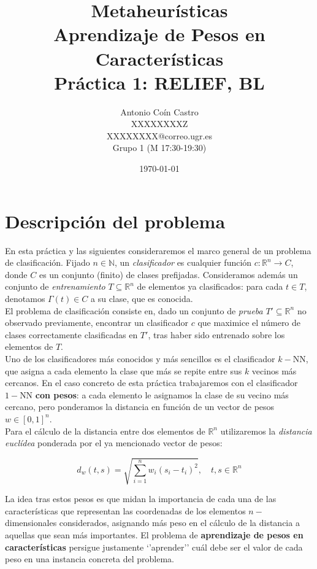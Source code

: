 \documentclass[12pt]{article}
\title{Metaheurísticas\\ \Large Aprendizaje de Pesos en Características \\ \large Práctica 1: RELIEF, BL}
\author{Antonio Coín Castro \\ XXXXXXXXZ \\ XXXXXXXX@correo.ugr.es \\ Grupo 1 (M 17:30-19:30)}
\date{\today}
\begin{document}
\maketitle

\newpage
\section{Descripción del problema}

En esta práctica y las siguientes consideraremos el marco general de un problema de clasificación. Fijado $n \in \mathbb{N}$, un \textit{clasificador} es cualquier función $c: \mathbb{R}^n \to C$, donde $C$ es un conjunto (finito) de clases prefijadas. Consideramos además un conjunto de \textit{entrenamiento} $T \subseteq \mathbb{R}^n$ de elementos ya clasificados: para cada $t \in T$, denotamos $\Gamma(t) \in C$ a su clase, que es conocida.\\

El problema de clasificación consiste en, dado un conjunto de \textit{prueba} $T'\subseteq \mathbb{R}^n$ no observado previamente, encontrar un clasificador $c$ que maximice el número de clases correctamente clasificadas en $T'$, tras haber sido entrenado sobre los elementos de $T$.\\

Uno de los clasificadores más conocidos y más sencillos es el clasificador $k-$NN, que asigna a cada elemento la clase que más se repite entre sus $k$ vecinos más cercanos. En el caso concreto de esta práctica trabajaremos con el clasificador $1-$NN \textbf{con pesos}: a cada elemento le asignamos la clase de su vecino más cercano, pero ponderamos la distancia en función de un vector de pesos $w \in [0,1]^n$.\\

Para el cálculo de la distancia entre dos elementos de $\mathbb{R}^n$ utilizaremos la \textit{distancia euclídea} ponderada por el ya mencionado vector de pesos:

\[
    d_w(t, s) = \sqrt{\sum_{i=1}^n w_i (s_i - t_i)^2}, \quad t, s \in \mathbb{R}^n
\]
\vspace{.5em}

La idea tras estos pesos es que midan la importancia de cada una de las características que representan las coordenadas de los elementos $n-$dimensionales considerados, asignando más peso en el cálculo de la distancia a aquellas que sean más importantes. El problema de \textbf{aprendizaje de pesos en características} persigue justamente `'aprender'' cuál debe ser el valor de cada peso en una instancia concreta del problema.\\
\end{document}
